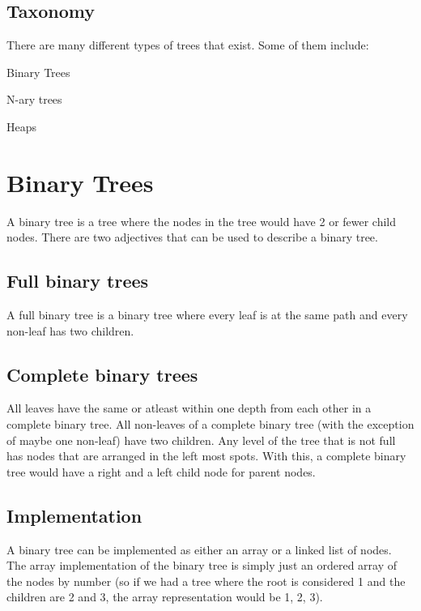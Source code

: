 \documentclass[11pt,a4paper,english]{report}
\begin{document}
\bigskip

\subsection{Taxonomy}

There are many different types of trees that exist. Some of them include:
\begin{itemize} {

    \item Binary Trees
    \item N-ary trees
    \item Heaps

}\end{itemize}

\section{Binary Trees}

A binary tree is a tree where the nodes in the tree would have 2 or fewer child nodes. There are two adjectives that can be used to describe a binary tree.

\subsection{Full binary trees}

A full binary tree is a binary tree where every leaf is at the same path and every non-leaf has two children.

\subsection{Complete binary trees}

All leaves have the same or atleast within one depth from each other in a complete binary tree. All non-leaves of a complete binary tree (with the exception of maybe one non-leaf) have two children. Any level of the tree that is not full has nodes that are arranged in the left most spots. With this, a complete binary tree would have a right and a left child node for parent nodes.

\subsection{Implementation}

A binary tree can be implemented as either an array or a linked list of nodes. The array implementation of the binary tree is simply just an ordered array of the nodes by number (so if we had a tree where the root is considered 1 and the children are 2 and 3, the array representation would be 1, 2, 3).
\end{document}
